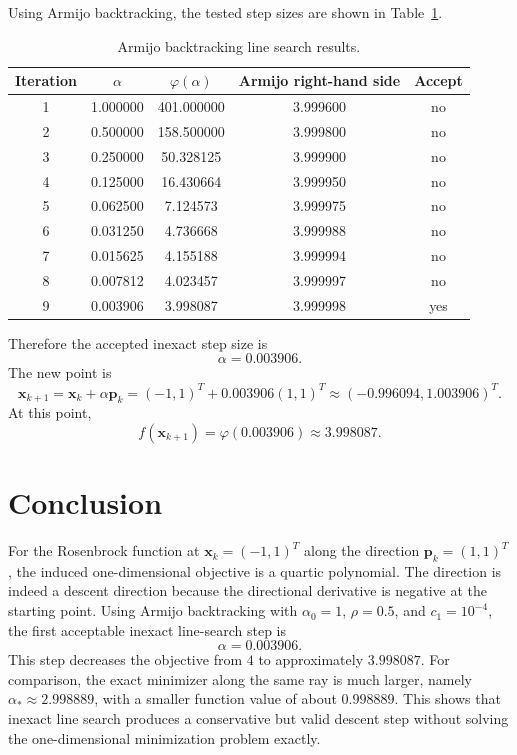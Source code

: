 \documentclass{article}
\begin{document}
Using Armijo backtracking, the tested step sizes are shown in Table~\ref{tab:armijo}.

\begin{table}[H]
    \centering
    \begin{tabular}{ccccc}
        \toprule
        Iteration & $\alpha$ & $\varphi(\alpha)$ & Armijo right-hand side & Accept \\
        \midrule
        1         & 1.000000 & 401.000000        & 3.999600               & no     \\
        2         & 0.500000 & 158.500000        & 3.999800               & no     \\
        3         & 0.250000 & 50.328125         & 3.999900               & no     \\
        4         & 0.125000 & 16.430664         & 3.999950               & no     \\
        5         & 0.062500 & 7.124573          & 3.999975               & no     \\
        6         & 0.031250 & 4.736668          & 3.999988               & no     \\
        7         & 0.015625 & 4.155188          & 3.999994               & no     \\
        8         & 0.007812 & 4.023457          & 3.999997               & no     \\
        9         & 0.003906 & 3.998087          & 3.999998               & yes    \\
        \bottomrule
    \end{tabular}
    \caption{Armijo backtracking line search results.}
    \label{tab:armijo}
\end{table}

Therefore the accepted inexact step size is
\[
    \alpha = 0.003906.
\]
The new point is
\[
    \bm{x}_{k+1} = \bm{x}_k + \alpha \bm{p}_k
    = (-1, 1)^T + 0.003906(1, 1)^T
    \approx (-0.996094, 1.003906)^T.
\]
At this point,
\[
    f(\bm{x}_{k+1}) = \varphi(0.003906) \approx 3.998087.
\]

\section{Conclusion}

For the Rosenbrock function at $\bm{x}_k = (-1,1)^T$ along the direction $\bm{p}_k = (1,1)^T$, the induced one-dimensional objective is a quartic polynomial. The direction is indeed a descent direction because the directional derivative is negative at the starting point. Using Armijo backtracking with $\alpha_0 = 1$, $\rho = 0.5$, and $c_1 = 10^{-4}$, the first acceptable inexact line-search step is
\[
    \alpha = 0.003906.
\]
This step decreases the objective from $4$ to approximately $3.998087$. For comparison, the exact minimizer along the same ray is much larger, namely $\alpha_* \approx 2.998889$, with a smaller function value of about $0.998889$. This shows that inexact line search produces a conservative but valid descent step without solving the one-dimensional minimization problem exactly.
\end{document}
